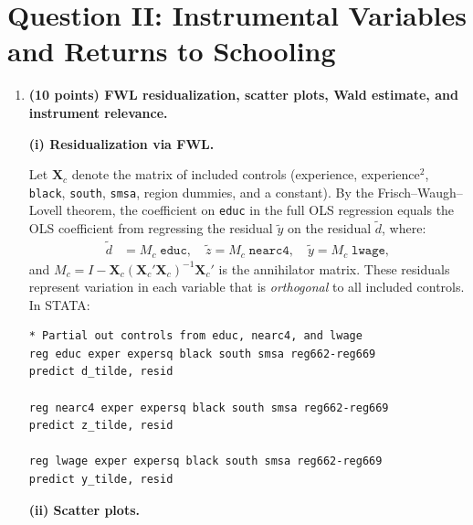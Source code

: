 \documentclass[letterpaper,12pt]{article}
\begin{document}
\section*{Question II: Instrumental Variables and Returns to Schooling}

\begin{enumerate}[label=(\alph*)]

\item \textbf{(10 points) FWL residualization, scatter plots, Wald estimate, and instrument relevance.}

\medskip
\textbf{(i) Residualization via FWL.}

Let $\bm{X}_c$ denote the matrix of included controls (experience, experience$^2$, \texttt{black}, \texttt{south}, \texttt{smsa}, region dummies, and a constant). By the Frisch--Waugh--Lovell theorem, the coefficient on \texttt{educ} in the full OLS regression equals the OLS coefficient from regressing the residual $\tilde{y}$ on the residual $\tilde{d}$, where:
\begin{align*}
\tilde{d} &= M_c\;\texttt{educ}, \quad \tilde{z} = M_c\;\texttt{nearc4}, \quad \tilde{y} = M_c\;\texttt{lwage},
\end{align*}
and $M_c = I - \bm{X}_c(\bm{X}_c'\bm{X}_c)^{-1}\bm{X}_c'$ is the annihilator matrix. These residuals represent variation in each variable that is \emph{orthogonal} to all included controls. In STATA:
\begin{verbatim}
* Partial out controls from educ, nearc4, and lwage
reg educ exper expersq black south smsa reg662-reg669
predict d_tilde, resid

reg nearc4 exper expersq black south smsa reg662-reg669
predict z_tilde, resid

reg lwage exper expersq black south smsa reg662-reg669
predict y_tilde, resid
\end{verbatim}

\medskip
\textbf{(ii) Scatter plots.}


\end{enumerate}
\end{document}
